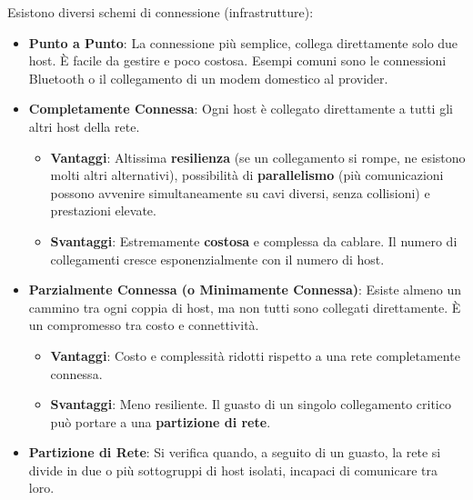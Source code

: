 Esistono diversi schemi di connessione (infrastrutture):
\begin{itemize}
    \item \textbf{Punto a Punto}: La connessione più semplice, collega direttamente solo due host. È facile da gestire e poco costosa. Esempi comuni sono le connessioni Bluetooth o il collegamento di un modem domestico al provider.
    \item \textbf{Completamente Connessa}: Ogni host è collegato direttamente a tutti gli altri host della rete.
    \begin{itemize}
        \item \textbf{Vantaggi}: Altissima \textbf{resilienza} (se un collegamento si rompe, ne esistono molti altri alternativi), possibilità di \textbf{parallelismo} (più comunicazioni possono avvenire simultaneamente su cavi diversi, senza collisioni) e prestazioni elevate.
        \item \textbf{Svantaggi}: Estremamente \textbf{costosa} e complessa da cablare. Il numero di collegamenti cresce esponenzialmente con il numero di host.
    \end{itemize}
    \item \textbf{Parzialmente Connessa (o Minimamente Connessa)}: Esiste almeno un cammino tra ogni coppia di host, ma non tutti sono collegati direttamente. È un compromesso tra costo e connettività.
    \begin{itemize}
        \item \textbf{Vantaggi}: Costo e complessità ridotti rispetto a una rete completamente connessa.
        \item \textbf{Svantaggi}: Meno resiliente. Il guasto di un singolo collegamento critico può portare a una \textbf{partizione di rete}.
    \end{itemize}
    \item \textbf{Partizione di Rete}: Si verifica quando, a seguito di un guasto, la rete si divide in due o più sottogruppi di host isolati, incapaci di comunicare tra loro.
\end{itemize}


